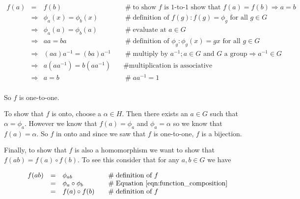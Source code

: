 \documentclass{article}
\theoremstyle{definition}
\begin{document}
\begin{equation*}
\begin{array}{rcll}
f(a)
&=& f(b)                                                  &\quad  \mathrel{\#} \text{to show $f$ is 1-to-1 show that } f(a) = f(b) \Rightarrow a = b \\
&\Rightarrow& \phi_a(x) = \phi_b(x)       &\quad  \mathrel{\#} \text{definition of $f(g): f(g) = \phi_g \text{ for all } g \in G$} \\
&\Rightarrow& \phi_a(a) = \phi_b(a)       &\quad  \mathrel{\#} \text{evaluate at $a \in G$} \\
&\Rightarrow& aa = ba                           &\quad  \mathrel{\#} \text{definition of $\phi_{g}: \phi_{g}(x) = gx  \text{ for all } g \in G$} \\
&\Rightarrow& (aa)a^{-1} = (ba)a^{-1}    &\quad  \mathrel{\#} \text{multiply by $a^{-1}$}; a \in G \text{ and $G$ a group} \Rightarrow a^{-1} \in G \\
&\Rightarrow& a(aa^{-1}) = b(aa^{-1})    &\quad  \mathrel{\#} \text{multiplication is associative}            \\
&\Rightarrow& a = b                               &\quad  \mathrel{\#} aa^{-1} = 1    \\
\end{array}
\end{equation*}

\bigskip
\noindent
So $f$ is one-to-one. 

\bigskip
\noindent
To show that $f$ is onto, choose a $\alpha \in H$. Then there exists an $a \in G$ such that $\alpha = \phi_a$. However we know that 
$f(a) = \phi_a$ and  $\phi_a = \alpha$ so we know that  $f(a) = \alpha$. So $f$ in onto and since we saw that $f$ is one-to-one, $f$ is a bijection.


\bigskip
\noindent
Finally, to show that $f$ is also a homomorphism we want to show that $f(ab) = f(a) \circ f(b)$. To see this consider that for any $a,b \in G$ we have 

\bigskip
\begin{equation*}
\begin{array}{rcll}
f(ab)
&=& \phi_{ab}                          &\quad  \mathrel{\#} \text{definition of $f$}                                           \\
&=& \phi_{a} \circ \phi_{b}       &\quad  \mathrel{\#} \text{Equation  \ref{eqn:function_composition}}   \\
&=& f(a) \circ f(b)                     &\quad  \mathrel{\#} \text{definition of $f$}
\end{array}
\end{equation*}
\end{document}
